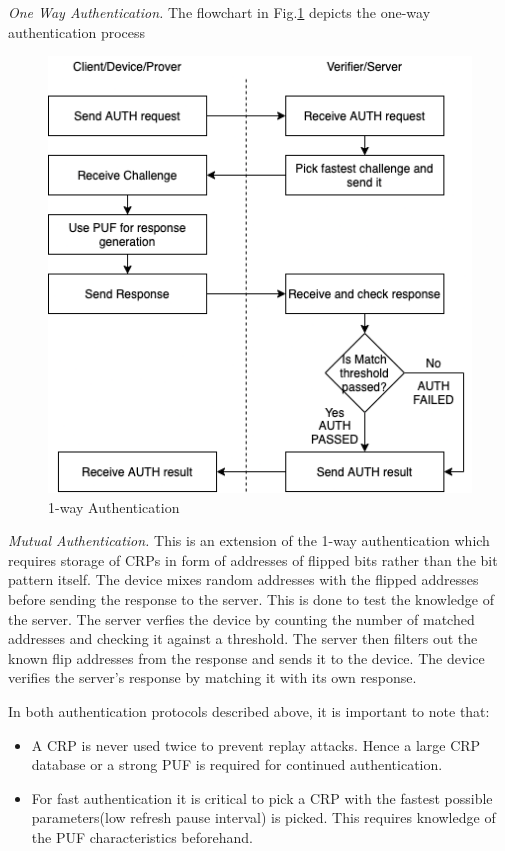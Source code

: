 \documentclass[journal, a4paper]{IEEEtran}
\begin{document}
\textit{One Way Authentication.} The flowchart in Fig.\ref{fig:one_way} depicts the one-way authentication process

\begin{figure}[!hbt]
    \begin{center}
    \includegraphics[scale=0.5]{figs/authentication.png}
    \caption{1-way Authentication}
    \label{fig:one_way}
    \end{center}
\end{figure}

\textit{Mutual Authentication.} This is an extension of the 1-way authentication which requires storage of CRPs in form of addresses of flipped bits rather than the bit pattern itself. The device mixes random addresses with the flipped addresses before sending the response to the server. This is done to test the knowledge of the server. The server verfies the device by counting the number of matched addresses and checking it against a threshold. The server then filters out the known flip addresses from the response and sends it to the device. The device verifies the server's response by matching it with its own response.

In both authentication protocols described above, it is important to note that:
\begin{itemize}
    \item A CRP is never used twice to prevent replay attacks. Hence a large CRP database or a strong PUF is required for continued authentication.
    \item For fast authentication it is critical to pick a CRP with the fastest possible parameters(low refresh pause interval) is picked. This requires knowledge of the PUF characteristics beforehand.
\end{itemize}
\end{document}
